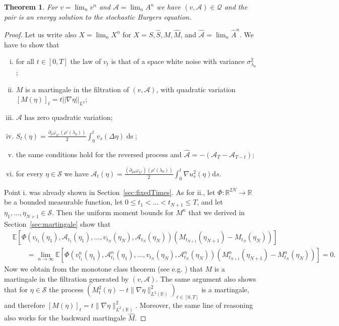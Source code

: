 \documentclass[11pt, a4paper]{article}
\newcommand{\mathd}{\mathrm{d}}
\newcommand{\tmop}[1]{\ensuremath{\operatorname{#1}}}
\newenvironment{enumerateroman}{\begin{enumerate}[i.] }{\end{enumerate}}
\newtheorem{theorem}{Theorem}[section]
\newcommand{\CS}{\mathscr{S}}
\newcommand{\1}{\mathbf{1}}
\begin{document}
\begin{theorem}
  For $v = \lim_n v^n$ and $\mathcal{A}= \lim_n A^n$ we have $(v, \mathcal{A})
  \in \mathcal{Q}$ and the pair is an energy solution to the stochastic
  Burgers equation.
\end{theorem}

\begin{proof}
  Let us write also $X = \lim_n X^n$ for $X = S, \hat{S}, M, \hat{M}$, and
  $\hat{\mathcal{A}} = \lim_n \hat{A}^n$. We have to show that
  \begin{enumerateroman}
    \item for all $t \in [0, T]$ the law of $v_t$ is that of a space white
    noise with variance $\sigma_{\lambda_0}^2$;
    
    \item $M$ is a martingale in the filtration of $(v, \mathcal{A})$, with
    quadratic variation $[M (\eta)]_t = t | | \nabla \eta | |_{L^2}$;
    
    \item $\mathcal{A}$ has zero quadratic variation;
    
    \item $S_t (\eta) = \frac{\partial_{\rho} \varphi_{V'} (\rho'
    (\lambda_0))}{2} \int_{0^{}}^t v_s (\Delta \eta) \tmop{ds}$;
    
    \item the same conditions hold for the reversed process and
    $\hat{\mathcal{A}} = - (\mathcal{A}_T -\mathcal{A}_{T - t})$;
    
    \item for every $\eta \in \CS$ we have $\mathcal{A}_t (\eta) =
    \frac{(\partial_{\rho \rho} \varphi_{V'}) (\rho' (\lambda_0))}{2} \int_0^t
    \nabla u_s^2 (\eta) \mathd s$.
  \end{enumerateroman}
  Point i. was already shown in Section~\ref{sec:fixedTimes}.  As for ii., let $\Phi : \mathbb{R}^{2 N} \rightarrow \mathbb{R}$ be a
  bounded measurable function, let $0 \leqslant t_1 < \ldots < t_{N + 1}
  \leqslant T$, and let $\eta_1, \ldots, \eta_{N + 1} \in \CS$. Then the
  uniform moment bounds for $M^n$ that we derived in
  Section~\ref{sec:martingale} show that
  \begin{align*}
     & \mathbb{E} [\Phi (v_{t_1} (\eta_1), \mathcal{A}_{t_1} (\eta_1), \ldots,
     v_{t_N} (\eta_N), \mathcal{A}_{t_N} (\eta_N)) (M_{t_{N + 1}} (\eta_{N +
     1}) - M_{t_N} (\eta_N))] \\
      &\qquad = \lim_{n \rightarrow \infty} \mathbb{E} [\Phi (v^n_{t_1} (\eta_1),
     \mathcal{A}^n_{t_1} (\eta_1), \ldots, v_{t_N} (\eta_N),
     \mathcal{A}^n_{t_N} (\eta_N)) (M^n_{t_{N + 1}} (\eta_{N + 1}) - M^n_{t_N}
     (\eta_N))] = 0.
  \end{align*}
     Now we obtain from the monotone class theorem (see e.g. \cite[Corollary~4.4]{bib:ethierKurtz}) that $M$ is a martingale in the
  filtration generated by $(v, \mathcal{A})$. The same argument also shows
  that for $\eta \in \CS$ the process $(M_t^2 (\eta) - t \| \nabla \eta
  \|_{L^2 (\mathbb{R})}^2)_{t \in [0, T]}$ is a martingale, and therefore $[M (\eta)]_t = t \| \nabla \eta \|^2_{L^2
  (\mathbb{R})}$. Moreover, the same line of reasoning also works for the
  backward martingale $\hat{M}$.
  

\end{proof}
\end{document}
